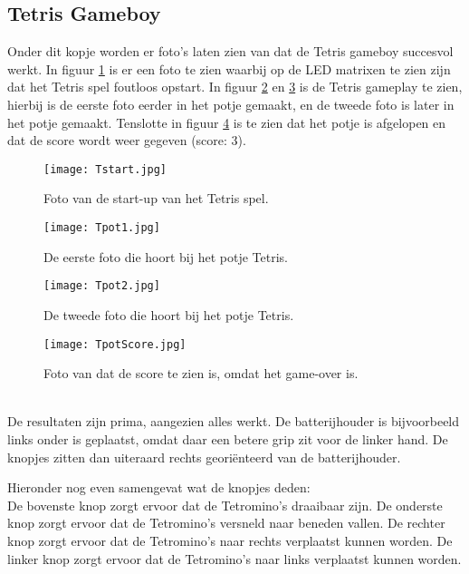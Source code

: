 \subsection{Tetris Gameboy}
\label{subsec:results:tetrisgame}
Onder dit kopje worden er foto's laten zien van dat de Tetris gameboy succesvol werkt. In figuur \ref{fig:Tstart} is er een foto te zien waarbij op de LED matrixen te zien zijn dat het Tetris spel foutloos opstart. 
In figuur \ref{fig:Tpot1} en \ref{fig:Tpot2} is de Tetris gameplay te zien, hierbij is de eerste foto eerder in het potje gemaakt, en de tweede foto is later in het potje gemaakt. 
Tenslotte in figuur \ref{fig:TpotScore} is te zien dat het potje is afgelopen en dat de score wordt weer gegeven (score: 3).
\begin{figure}[h]
    \centering
    \texttt{[image: Tstart.jpg]}
    \caption{Foto van de start-up van het Tetris spel.}
    \label{fig:Tstart}
\end{figure}
\begin{figure}[h]
    \centering
    \texttt{[image: Tpot1.jpg]}
    \caption{De eerste foto die hoort bij het potje Tetris.}
    \label{fig:Tpot1}
\end{figure}
\pagebreak
\begin{figure}[h]
    \centering
    \texttt{[image: Tpot2.jpg]}
    \caption{De tweede foto die hoort bij het potje Tetris.}
    \label{fig:Tpot2}
\end{figure}
\begin{figure}[h]
    \centering
    \texttt{[image: TpotScore.jpg]}
    \caption{Foto van dat de score te zien is, omdat het game-over is.}
    \label{fig:TpotScore}
\end{figure}\\
De resultaten zijn prima, aangezien alles werkt. De batterijhouder is bijvoorbeeld links onder is geplaatst, omdat daar een betere grip zit voor de linker hand. 
De knopjes zitten dan uiteraard rechts georiënteerd van de batterijhouder.

Hieronder nog even samengevat wat de knopjes deden:\\
De bovenste knop zorgt ervoor dat de Tetromino's draaibaar zijn. De onderste knop zorgt ervoor dat de Tetromino's versneld naar beneden vallen. 
De rechter knop zorgt ervoor dat de Tetromino's naar rechts verplaatst kunnen worden. De linker knop zorgt ervoor dat de Tetromino's naar links verplaatst kunnen worden. 
\pagebreak